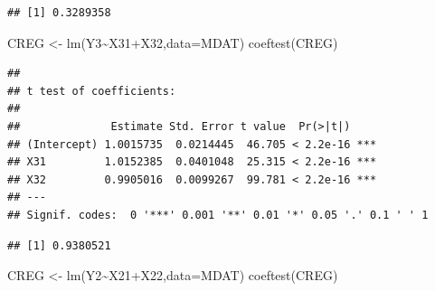 \documentclass[
]{book}
\newenvironment{Shaded}{\begin{snugshade}}{\end{snugshade}}
\newcommand{\AttributeTok}[1]{\textcolor[rgb]{0.77,0.63,0.00}{#1}}
\newcommand{\CommentTok}[1]{\textcolor[rgb]{0.56,0.35,0.01}{\textit{#1}}}
\newcommand{\FunctionTok}[1]{\textcolor[rgb]{0.00,0.00,0.00}{#1}}
\newcommand{\NormalTok}[1]{#1}
\newcommand{\OtherTok}[1]{\textcolor[rgb]{0.56,0.35,0.01}{#1}}
\newcommand{\SpecialCharTok}[1]{\textcolor[rgb]{0.00,0.00,0.00}{#1}}
\begin{document}
\begin{Shaded}
\end{Shaded}

\begin{verbatim}
## [1] 0.3289358
\end{verbatim}

\begin{Shaded}
\begin{Highlighting}[]
\NormalTok{CREG }\OtherTok{\textless{}{-}} \FunctionTok{lm}\NormalTok{(Y3}\SpecialCharTok{\textasciitilde{}}\NormalTok{X31}\SpecialCharTok{+}\NormalTok{X32,}\AttributeTok{data=}\NormalTok{MDAT)}
\FunctionTok{coeftest}\NormalTok{(CREG)}
\end{Highlighting}
\end{Shaded}

\begin{verbatim}
## 
## t test of coefficients:
## 
##              Estimate Std. Error t value  Pr(>|t|)    
## (Intercept) 1.0015735  0.0214445  46.705 < 2.2e-16 ***
## X31         1.0152385  0.0401048  25.315 < 2.2e-16 ***
## X32         0.9905016  0.0099267  99.781 < 2.2e-16 ***
## ---
## Signif. codes:  0 '***' 0.001 '**' 0.01 '*' 0.05 '.' 0.1 ' ' 1
\end{verbatim}

\begin{Shaded}
\end{Shaded}

\begin{verbatim}
## [1] 0.9380521
\end{verbatim}

\begin{Shaded}
\begin{Highlighting}[]
\NormalTok{CREG }\OtherTok{\textless{}{-}} \FunctionTok{lm}\NormalTok{(Y2}\SpecialCharTok{\textasciitilde{}}\NormalTok{X21}\SpecialCharTok{+}\NormalTok{X22,}\AttributeTok{data=}\NormalTok{MDAT)}
\FunctionTok{coeftest}\NormalTok{(CREG)}
\end{Highlighting}
\end{Shaded}
\end{document}
